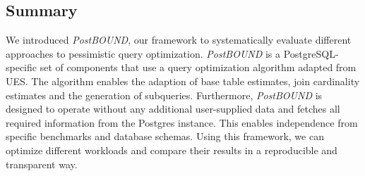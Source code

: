 \subsection{Summary}
\label{sec:postbound-summary}

We introduced \emph{PostBOUND}, our framework to systematically evaluate different approaches to pessimistic query optimization. \emph{PostBOUND} is a PostgreSQL-specific set of components that use a query optimization algorithm adapted from UES. The algorithm enables the adaption of base table estimates, join cardinality estimates and the generation of subqueries. Furthermore, \emph{PostBOUND} is designed to operate without any additional user-supplied data and fetches all required information from the Postgres instance. This enables independence from specific benchmarks and database schemas. Using this framework, we can optimize different workloads and compare their results in a reproducible and transparent way.
